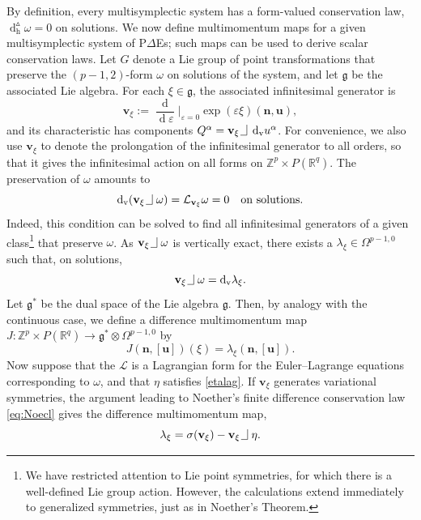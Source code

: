 \documentclass[11pt]{article} %
\numberwithin{equation}{section}
\newcommand{\intpsym}{\,\, \setlength{\unitlength}{0.4mm}
	\begin{picture}(0, 0)(5, 5)%
	\put(0, 4){\line(1,0){5}} \put(5,4){\line(0,1){8}}
	\end{picture}\,\,}
\newcommand{\intp}{\,\,\intpsym}
\newcommand{\upd}{\operatorname{d}}
\newcommand{\uph}{\operatorname{h}}
\newcommand{\upv}{\operatorname{v}}
\newcommand{\dv}{\upd_{\upv}\!}
\newcommand{\pde}{P$\Delta$E}
\newcommand{\mbn}{\mathbf{n}}
\newcommand{\mbu}{\mathbf{u}}
\newcommand{\mbv}{\mathbf{v}}
\newcommand{\mcL}{\mathcal{L}}
\newcommand{\msL}{\mathscr{L}}
\newcommand{\dDh}{\upd^{\vartriangle}_{\uph}}
\theoremstyle{plain}
\theoremstyle{definition}
\begin{document}
By definition, every multisymplectic system has a form-valued conservation law, $\dDh\omega=0$ on solutions.
We now define multimomentum  maps for a given multisymplectic
system of \pde{s}; such maps can be used to derive scalar conservation laws. Let $G$ denote a Lie group of point transformations that preserve
the $(p-1,2)$-form $\omega$ on solutions of the system, and let $\mathfrak{g}$ be the associated Lie algebra. For each $\xi\in \mathfrak{g}$, the associated infinitesimal generator is
\begin{equation}
\mbv_{\xi}:=\frac{\upd}{\upd\!\varepsilon}\Big|_{\varepsilon=0}\exp(\varepsilon\xi)(\mbn,\mbu),
\end{equation}
and its characteristic has components $Q^{\alpha}=\mbv_{\xi}\intp\dv u^{\alpha}$. For convenience, we also use $\mbv_{\xi}$ to denote the prolongation of the infinitesimal generator to all orders, so that it gives the infinitesimal action on all forms on $\mathbb{Z}^p\times P(\mathbb{R}^q)$. The preservation of $\omega$ amounts to 
\begin{equation}   \dv\,(\mbv_\xi\intp\omega)=\mcL_{\mbv_\xi}\omega=0\quad\text{on solutions}.
\end{equation}
Indeed, this condition can be solved to find all infinitesimal generators of a given class\footnote{We have restricted attention to Lie point symmetries, for which there is a well-defined Lie group action. However, the calculations extend immediately to generalized symmetries, just as in Noether's Theorem.} that preserve $\omega$. As $\mbv_{\xi}\intp\omega$ is vertically exact, there exists a $\lambda_{\xi}\in\Omega^{p-1,0}$ such
that, on solutions,
\begin{equation}
\label{eq5}
\mbv_{\xi}\intp\omega=\dv \lambda_{\xi}.
\end{equation}
Let $\mathfrak{g}^{\ast}$ be the dual space of the Lie algebra
$\mathfrak{g}$. Then, by analogy with the continuous case, we define a difference multimomentum map
$J:\mathbb{Z}^p\times P(\mathbb{R}^q)\to\mathfrak{g}^{\ast}\otimes\Omega^{p-1,0}$
by
\begin{equation}
\label{mm} J(\mbn,[\mbu])(\xi)=\lambda_{\xi}(\mbn,[\mbu]).
\end{equation}
Now suppose that the $\msL$ is a Lagrangian form for the Euler--Lagrange equations corresponding to $\omega$, and that $\eta$ satisfies \eqref{etalag}. If $\mbv_\xi$ generates variational symmetries, the argument leading to Noether's finite difference conservation law \eqref{eq:Noecl}
gives the difference multimomentum map,
\begin{equation}
\lambda_{\xi}=\sigma(\mbv_{\xi})-\mbv_{\xi}\intp\eta.
\end{equation}
\end{document}
